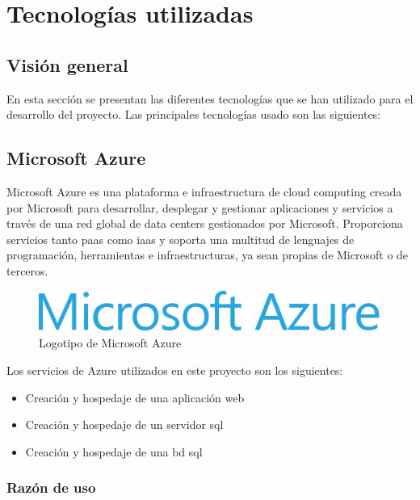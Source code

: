 \chapter{Tecnologías utilizadas}

\section{Visión general}

En esta sección se presentan las diferentes tecnologías que se han utilizado para el desarrollo del proyecto. Las principales tecnologías usado son las siguientes:

\section{Microsoft Azure}

Microsoft Azure\cite{Azure} es una plataforma e infraestructura de cloud computing creada por Microsoft para desarrollar, desplegar y gestionar aplicaciones y servicios a través de una red global de data centers gestionados por Microsoft.
Proporciona servicios tanto \acrshort{paas} como \acrshort{iaas} y soporta una multitud de lenguajes de programación, herramientas e infraestructuras, ya sean propias de Microsoft o de terceros.

\begin{figure}[!htbp]
	\centering
	\includegraphics[scale=1.2]{fig/microsoft_azure}
	\caption{Logotipo de Microsoft Azure}
\end{figure}

\FloatBarrier

Los servicios de Azure utilizados en este proyecto son los siguientes:
\begin{itemize}
	\item Creación y hospedaje de una aplicación web
	\item Creación y hospedaje de un servidor \acrshort{sql}
	\item Creación y hospedaje de una \acrshort{bd} \acrshort{sql}
\end{itemize}

\subsection{Razón de uso}

